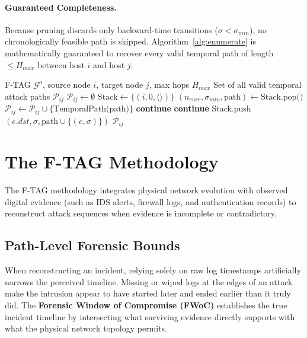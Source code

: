 \documentclass[12pt]{article}
\begin{document}
\paragraph{Guaranteed Completeness.}
Because pruning discards only backward-time transitions ($\sigma < \sigma_{min}$), no chronologically feasible path is skipped. Algorithm~\ref{alg:enumerate} is mathematically guaranteed to recover every valid temporal path of length $\le H_{max}$ between host $i$ and host $j$.

\begin{algorithm}[t]
\caption{Temporal Path Enumeration ($Q^a_{ij}$)}
\label{alg:enumerate}
\footnotesize
\begin{algorithmic}[1]
\REQUIRE F-TAG $\mathcal{G}^a$, source node $i$, target node $j$, max hops $H_{max}$
\ENSURE Set of all valid temporal attack paths $\mathcal{P}_{ij}$
\STATE $\mathcal{P}_{ij} \gets \emptyset$
\STATE $\text{Stack} \gets \{(i, 0, \langle\rangle)\}$ 
    \STATE $(n_{curr}, \sigma_{min}, \text{path}) \gets \text{Stack.pop()}$
        \STATE $\mathcal{P}_{ij} \gets \mathcal{P}_{ij} \cup \{\text{TemporalPath(path)}\}$
        \STATE \textbf{continue}
    \ENDIF
        \STATE \textbf{continue}
    \ENDIF
            \STATE Stack.push$(e.dst, \sigma, \text{path} \cup \{(e, \sigma)\})$
        \ENDFOR
    \ENDFOR
\ENDWHILE
\RETURN $\mathcal{P}_{ij}$
\end{algorithmic}
\end{algorithm}

\section{The F-TAG Methodology}\label{sec:methodology}

The F-TAG methodology integrates physical network evolution with observed digital evidence (such as IDS alerts, firewall logs, and authentication records) to reconstruct attack sequences when evidence is incomplete or contradictory.

\subsection{Path-Level Forensic Bounds}\label{sec:path-metrics}

When reconstructing an incident, relying solely on raw log timestamps artificially narrows the perceived timeline. Missing or wiped logs at the edges of an attack make the intrusion appear to have started later and ended earlier than it truly did. The \textbf{Forensic Window of Compromise (FWoC)} establishes the true incident timeline by intersecting what surviving evidence directly supports with what the physical network topology permits.
\end{document}
